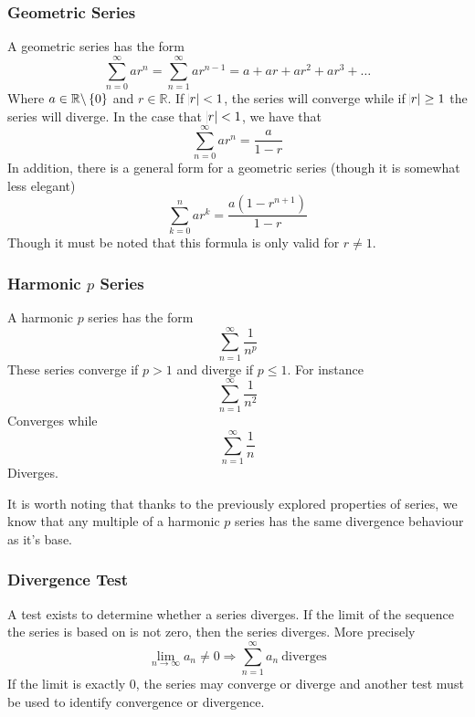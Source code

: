 \documentclass[12pt]{report}
\newcommand{\R}{\mathbb{R}}
\newcommand{\limit}{\lim\limits}
\newcommand{\sumninf}[1][1]{\sum\limits_{n = #1}^\infty}
\begin{document}
\begin{flushleft}
\subsubsection*{Geometric Series}
A geometric series has the form
\[\sumninf[0] ar^n = \sumninf ar^{n - 1} = a + ar + ar^2 + ar^3 + \ldots\]
Where \(a\in\R\backslash\set{0}\) and \(r\in\R\). If \(\abs{r} < 1\), the
series will converge while if \(\abs{r} \geq 1\) the series will diverge.
In the case that \(\abs{r} < 1\), we have that
\[\sumninf[0]ar^n = \frac{a}{1 - r}\]
In addition, there is a general form for a geometric series (though it is 
somewhat less elegant)
\[\sum_{k = 0}^n ar^k = \frac{a\left(1 - r^{n + 1}\right)}{1 - r}\]
Though it must be noted that this formula is only valid for \(r\neq1\).

\subsubsection*{Harmonic \(p\) Series}
A harmonic \(p\) series has the form
\[\sumninf\frac{1}{n^p}\]
These series converge if \(p > 1\) and diverge if \(p \leq 1\). For instance
\[\sumninf \frac{1}{n^2}\]
Converges while
\[\sumninf \frac{1}{n}\]
Diverges. \par
It is worth noting that thanks to the previously explored properties of series,
we know that any multiple of a harmonic \(p\) series has the same divergence
behaviour as it's base.

\subsubsection*{Divergence Test}
A test exists to determine whether a series diverges. If the limit of the 
sequence the series is based on is not zero, then the series diverges. More
precisely
\[\limit_{n\rightarrow\infty} a_n \neq 0 \Rightarrow \sumninf a_n 
\:\mathrm{diverges}\]
If the limit is exactly \(0\), the series may converge or diverge and another
test must be used to identify convergence or divergence.


\end{flushleft}
\end{document}
